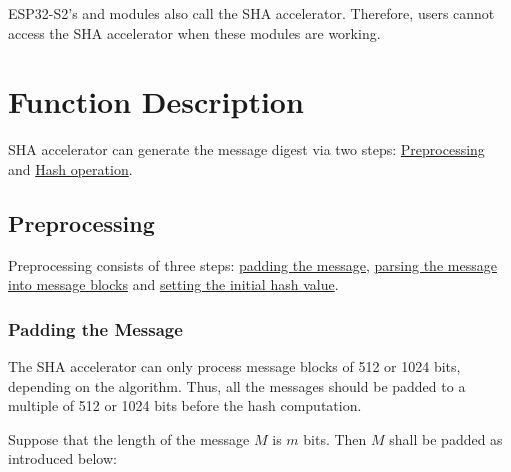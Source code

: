 \documentclass[main\_\_EN.tex]{subfiles}
\begin{document}
\begin{importantlisting}
\vspace{-0.5em}

    ESP32-S2's  and  modules also call the SHA accelerator. Therefore, users cannot access the SHA accelerator when these modules are working.
\end{importantlisting}

\section{Function Description}

SHA accelerator can generate the message digest via two steps: \hyperref[preprocessing]{Preprocessing} and  \hyperref[hashoperation]{Hash operation}.

\subsection{Preprocessing}\label{preprocessing}

Preprocessing consists of three steps: \hyperref[textpadding]{padding the message}, \hyperref[parsingmessage]{parsing the message into message blocks} and \hyperref[initialhash]{setting the initial hash value}.

\subsubsection{Padding the Message}\label{textpadding}

The SHA accelerator can only process message blocks of 512 or 1024 bits, depending on the algorithm. Thus, all the messages should be padded to a multiple of 512 or 1024 bits before the hash computation.

Suppose that the length of the message \begin{math}M\end{math} is \begin{math} m \end{math} bits. Then \begin{math} M \end{math} shall be padded as introduced below:
\end{document}
